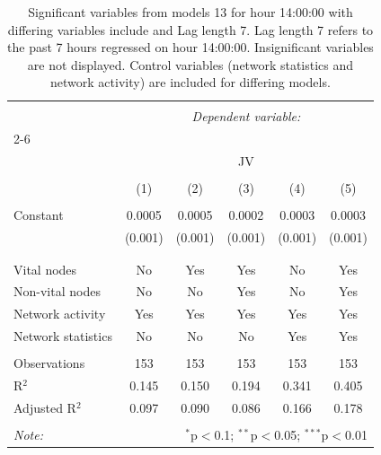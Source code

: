 
\begin{table}[!htbp] \centering 
  \caption{Significant variables from models 13 for hour 14:00:00 with differing variables include 
                               and Lag length 7. Lag length 7 refers to the past 7 hours regressed on hour 14:00:00. 
                               Insignificant variables are not displayed. 
                               Control variables (network statistics and network activity) are 
                               included for differing models.} 
  \label{Jmodels1_t_hourlagged1} 
\scriptsize 
\begin{tabular}{@{\extracolsep{5pt}}lccccc} 
\\[-1.8ex]\hline 
\hline \\[-1.8ex] 
 & \multicolumn{5}{c}{\textit{Dependent variable:}} \\ 
\cline{2-6} 
\\[-1.8ex] & \multicolumn{5}{c}{JV} \\ 
\\[-1.8ex] & (1) & (2) & (3) & (4) & (5)\\ 
\hline \\[-1.8ex] 
 Constant & 0.0005 & 0.0005 & 0.0002 & 0.0003 & 0.0003 \\ 
  & (0.001) & (0.001) & (0.001) & (0.001) & (0.001) \\ 
  & & & & & \\ 
\hline \\[-1.8ex] 
Vital nodes & No & Yes & Yes & No & Yes \\ 
Non-vital nodes & No & No & Yes & No & Yes \\ 
Network activity & Yes & Yes & Yes & Yes & Yes \\ 
Network statistics & No & No & No & Yes & Yes \\ 
\hline &  &  &  &  &  \\ 
Observations & 153 & 153 & 153 & 153 & 153 \\ 
R$^{2}$ & 0.145 & 0.150 & 0.194 & 0.341 & 0.405 \\ 
Adjusted R$^{2}$ & 0.097 & 0.090 & 0.086 & 0.166 & 0.178 \\ 
\hline 
\hline \\[-1.8ex] 
\textit{Note:}  & \multicolumn{5}{r}{$^{*}$p$<$0.1; $^{**}$p$<$0.05; $^{***}$p$<$0.01} \\ 
\end{tabular} 
\end{table} 
